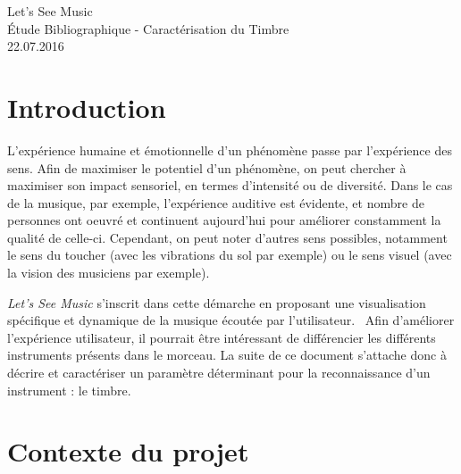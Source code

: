 \documentclass[10pt]{article}
\begin{document}
\vspace*{0in}

\begin{center}
	\huge{Let's See Music}\\
	\small{Étude Bibliographique - Caractérisation du Timbre}\\
	\small{22.07.2016}\\
\end{center}

\small

\vspace{.2in}

\begin{multicols}{2}






\label{intro}
\section{Introduction}

L'expérience humaine et émotionnelle d'un phénomène passe par l'expérience des sens.
Afin de maximiser le potentiel d'un phénomène, on peut chercher à maximiser son impact sensoriel, en termes d'intensité ou de diversité.
Dans le cas de la musique, par exemple, l'expérience auditive est évidente, et nombre de personnes ont oeuvré et continuent aujourd'hui pour améliorer constamment la qualité de celle-ci.
Cependant, on peut noter d'autres sens possibles, notamment le sens du toucher (avec les vibrations du sol par exemple) ou le sens visuel (avec la vision des musiciens par exemple).

\emph{Let's See Music} s'inscrit dans cette démarche en proposant une visualisation spécifique et dynamique de la musique écoutée par l'utilisateur.~\cite{LSM}
Afin d'améliorer l'expérience utilisateur, il pourrait être intéressant de différencier les différents instruments présents dans le morceau.
La suite de ce document s'attache donc à décrire et caractériser un paramètre déterminant pour la reconnaissance d'un instrument : le timbre.






\label{contexte}
\section{Contexte du projet}


\end{multicols}
\end{document}
